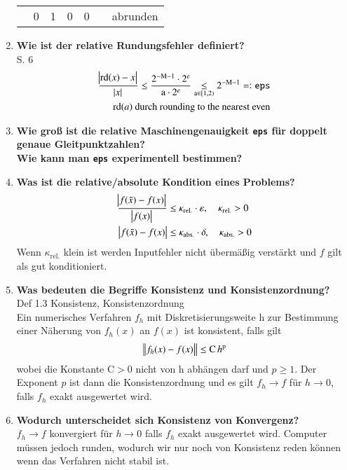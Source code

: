 \begin{enumerate}
\begin{table}[htbp]
\begin{tabular}[htpb]{ccccccl}
				      & 0                   & 1                       & 0                       & 0         &       & abrunden
			\end{tabular}
		\end{table}
		\item \textbf{Wie ist der relative Rundungsfehler definiert?} \\
		S. 6
		\begin{align*}
			\frac{\abs{\text{rd}(x)-x}}{\abs{x}}\leq \frac{2^{-\text{M}-1}\cdot2^e}{\text{a}\cdot 2^e}\underset{\text{a}\in[1,2)}{\leq}2^{-\text{M}-1}=:\texttt{eps} \\
			\text{rd}(a) \text{ durch rounding to the nearest even} 
		\end{align*}
		
		\item \textbf{Wie groß ist die relative Maschinengenauigkeit \texttt{eps} für doppelt genaue Gleitpunktzahlen?\\
					Wie kann man \texttt{eps} experimentell bestimmen?} \\
				
				
		\item \textbf{Was ist die relative/absolute Kondition eines Problems?}
			\begin{align*}
				\frac{\abs{f(\tilde{x})-f(x)}}{\abs{f(x)}} &\leq \kappa_{\text{rel.}}\cdot\varepsilon, \quad \kappa_{\text{rel.}} > 0 \\
				\abs{f(\tilde{x})-f(x)} &\leq \kappa_{\text{abs.}}\cdot\delta, \quad \kappa_{\text{abs.}} > 0
			\end{align*}
		Wenn \(\kappa_{\text{rel.}}\) klein ist werden Inputfehler nicht übermäßig verstärkt und \(f\) gilt als gut konditioniert.
		\item \textbf{Was bedeuten die Begriffe Konsistenz und Konsistenzordnung?} \\
			Def 1.3 Konsistenz, Konsistenzordnung \\
			Ein numerisches Verfahren \(f_h\) mit Diskretisierungsweite h zur Bestimmung einer Näherung von \(f_h(x)\) an \(f(x)\) ist konsistent, falls gilt
			\begin{align*}
				\norm{f_h(x)-f(x)}\leq \text{C}\,h^\text{p}
			\end{align*}
			wobei die Konstante \(\text{C}>0\) nicht von h abhängen darf und \(p\ge1\). Der Exponent \(p\) ist dann die Konsistenzordnung und es gilt \(f_h\rightarrow f\) für \( h \rightarrow 0\), falls \(f_h\) exakt ausgewertet wird. 
		
		\item \textbf{Wodurch unterscheidet sich Konsistenz von Konvergenz?} \\
			\(f_h\rightarrow f\) konvergiert für \( h \rightarrow 0\) falls \(f_h\) exakt ausgewertet wird. Computer müssen jedoch runden, wodurch wir nur noch von Konsistenz reden können wenn das Verfahren nicht stabil ist.
		

\end{enumerate}
